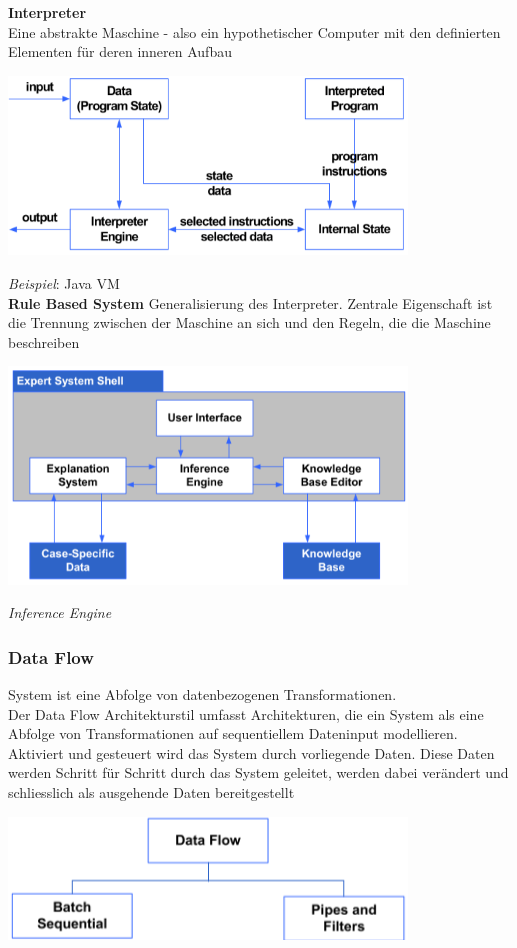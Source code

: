 \documentclass{report}
\newenvironment{Figure}
	{\par\medskip\noindent\minipage{\linewidth}}
	{\endminipage\par\medskip}
\theoremstyle{definition}
\theoremstyle{example}
\begin{document}
\textbf{Interpreter}\\
Eine abstrakte Maschine - also ein hypothetischer Computer mit den definierten Elementen für deren inneren Aufbau
\begin{Figure}
\centering
\includegraphics[width=400px]{img/Interpreter.png}
	\label{fig:Übersicht Interpreter (VM)}
\end{Figure}
\textit{Beispiel}: Java VM\\

\textbf{Rule Based System}
Generalisierung des Interpreter. Zentrale Eigenschaft ist die Trennung zwischen der Maschine an sich und den Regeln, die die Maschine beschreiben
\begin{Figure}
\centering
\includegraphics[width=400px]{img/RuleBasedSystem.png}
	\label{fig:Rule Based System}
\end{Figure}
\textit{Inference Engine}


\subsubsection{Data Flow}
System ist eine Abfolge von datenbezogenen Transformationen.\\
Der Data Flow Architekturstil umfasst Architekturen, die ein System als eine Abfolge von Transformationen auf sequentiellem Dateninput modellieren. Aktiviert und gesteuert wird das System durch vorliegende Daten. Diese Daten werden Schritt für Schritt durch das System geleitet, werden dabei verändert und schliesslich als ausgehende Daten bereitgestellt
\begin{Figure}
\centering
\includegraphics[width=400px]{img/DataFlow.png}
	\label{fig:Data Flow}
\end{Figure}
\end{document}
